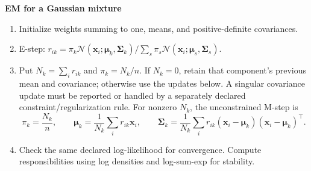 \documentclass[11pt,twoside]{article}
\numberwithin{equation}{section}
\newcommand{\vect}[1]{\bm{#1}}
\newcommand{\mat}[1]{\bm{#1}}
\theoremstyle{plain}
\theoremstyle{definition}
\theoremstyle{remark}
\begin{document}
\begin{algorithmbox}
\textbf{EM for a Gaussian mixture}
\begin{enumerate}
\item Initialize weights summing to one, means, and positive-definite covariances.
\item E-step: $r_{ik}=\pi_k\mathcal N(\vect x_i;\vect\mu_k,\mat\Sigma_k)/\sum_s\pi_s\mathcal N(\vect x_i;\vect\mu_s,\mat\Sigma_s)$.
\item Put $N_k=\sum_i r_{ik}$ and $\pi_k=N_k/n$. If $N_k=0$, retain that component's previous mean and covariance; otherwise use the updates below. A singular covariance update must be reported or handled by a separately declared constraint/regularization rule. For nonzero $N_k$, the unconstrained M-step is
\[
\pi_k=\frac{N_k}{n},\qquad \vect\mu_k=\frac1{N_k}\sum_i r_{ik}\vect x_i,\qquad
\mat\Sigma_k=\frac1{N_k}\sum_i r_{ik}(\vect x_i-\vect\mu_k)(\vect x_i-\vect\mu_k)^\top.
\]
\item Check the same declared log-likelihood for convergence. Compute responsibilities using log densities and log-sum-exp for stability.
\end{enumerate}
\end{algorithmbox}
\end{document}
